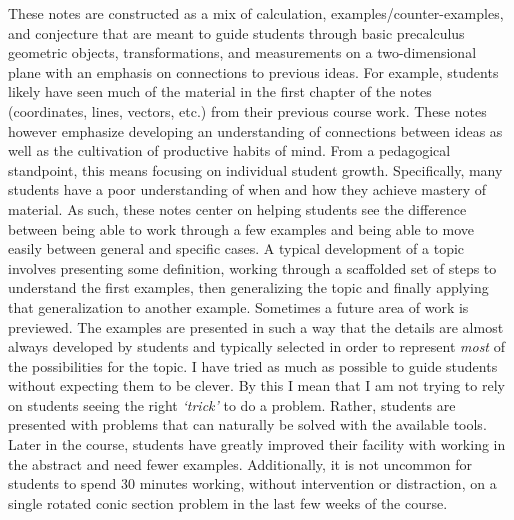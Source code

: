 \begin{annotation}
These notes are constructed as a mix of calculation, examples/counter-examples, and conjecture that are meant to guide students through basic precalculus geometric objects, transformations, and measurements on a two-dimensional plane with an emphasis on connections to previous ideas. For example, students likely have seen much of the material in the first chapter of the notes (coordinates, lines, vectors, etc.) from their previous course work. These notes however emphasize developing an understanding of connections between ideas as well as the cultivation of productive habits of mind. From a pedagogical standpoint, this means focusing on individual student growth. Specifically, many students have a poor understanding of when and how they achieve mastery of material. As such, these notes center on helping students see the difference between being able to work through a few examples and being able to move easily between general and specific cases. A typical development of a topic involves presenting some definition, working through a scaffolded set of steps to understand the first examples, then generalizing the topic and finally applying that generalization to another example. Sometimes a future area of work is previewed. The examples are presented in such a way that the details are almost always developed by students and typically selected in order to represent \textit{most} of the possibilities for the topic. I have tried as much as possible to guide students without expecting them to be clever. By this I mean that I am not trying to rely on students seeing the right \textit{\lq{trick}\rq} to do a problem. Rather, students are presented with problems that can naturally be solved with the available tools. Later in the course, students have greatly improved their facility with working in the abstract and need fewer examples. Additionally, it is not uncommon for students to spend 30 minutes working, without intervention or distraction, on a single rotated conic section problem in the last few weeks of the course.



\end{annotation}
